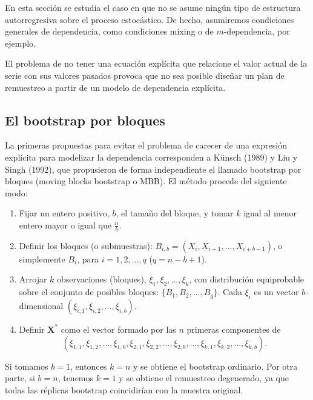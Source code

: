 \documentclass[
]{book}
\theoremstyle{break}
\theoremstyle{definition}
\theoremstyle{definition}
\theoremstyle{definition}
\theoremstyle{definition}
\theoremstyle{remark}
\begin{document}
En esta sección se estudia el caso en que no se asume ningún tipo de
estructura autorregresiva sobre el proceso estocástico. De hecho,
asumiremos condiciones generales de dependencia, como condiciones mixing
o de \(m\)-dependencia, por ejemplo.

El problema de no tener una ecuación explícita que relacione el valor
actual de la serie con sus valores pasados provoca que no sea posible
diseñar un plan de remuestreo a partir de un modelo de dependencia
explícita.

\hypertarget{el-bootstrap-por-bloques}{%
\subsection{El bootstrap por bloques}\label{el-bootstrap-por-bloques}}

La primeras propuestas para evitar el problema de carecer de una
expresión explícita para modelizar la dependencia corresponden a Künsch
(1989) y Liu y Singh (1992), que propusieron de forma independiente el
llamado bootstrap por bloques (moving blocks bootstrap o MBB). El método
procede del siguiente modo:

\begin{enumerate}
\def\labelenumi{\arabic{enumi}.}
\item
  Fijar un entero positivo, \(b\), el tamaño del bloque, y tomar \(k\)
  igual al menor entero mayor o igual que \(\frac{n}{b}\).
\item
  Definir los bloques (o submuestras): \(B_{i,b}=(X_i,X_{i+1},\ldots ,X_{i+b-1})\), o simplemente \(B_i\), para \(i=1,2,\ldots ,q\)
  (\(q=n-b+1\))\(.\)
\item
  Arrojar \(k\) observaciones (bloques), \(\xi _1,\xi _2,\ldots ,\xi _{k}\), con distribución equiprobable sobre el conjunto de posibles
  bloques: \(\{B_1,B_2,\ldots ,B_{q}\}\). Cada \(\xi _i\) es un
  vector \(b\)-dimensional \((\xi _{i,1},\xi _{i,2},\ldots ,\xi _{i,b})\).
\item
  Definir \(\mathbf{X}^{\ast}\) como el vector formado por las \(n\)
  primeras componentes de
  \[(\xi _{1,1},\xi _{1,2},\ldots ,\xi _{1,b},\xi _{2,1},\xi _{2,2},\ldots ,\xi
  _{2,b},\ldots ,\xi _{k,1},\xi _{k,2},\ldots ,\xi _{k,b}).\]
\end{enumerate}

Si tomamos \(b=1\), entonces \(k=n\) y se obtiene el bootstrap ordinario.
Por otra parte, si \(b=n\), tenemos \(k=1\) y se obtiene el remuestreo
degenerado, ya que todas las réplicas bootstrap coincidirían con la
muestra original.
\end{document}
